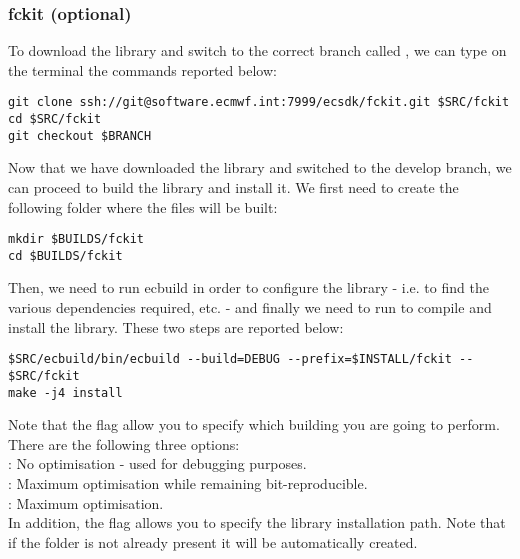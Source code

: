 \subsubsection{fckit (optional)}
To download the library and switch to the correct branch called 
, we can type on the terminal the commands reported 
below:
%
\begin{lstlisting}[style=BashStyle]
git clone ssh://git@software.ecmwf.int:7999/ecsdk/fckit.git $SRC/fckit
cd $SRC/fckit
git checkout $BRANCH
\end{lstlisting}
%
Now that we have downloaded the library and switched 
to the develop branch, we can proceed to build the 
library and install it. We first need to create the 
following folder where the files will be built:
%
\begin{lstlisting}[style=BashStyle]
mkdir $BUILDS/fckit
cd $BUILDS/fckit
\end{lstlisting}
%
Then, we need to run ecbuild in order to configure the 
library - i.e. to find the various dependencies required, 
etc. - and finally we need to run  
to compile and install the library. These two steps are 
reported below:
%
\begin{lstlisting}[style=BashStyle]
$SRC/ecbuild/bin/ecbuild --build=DEBUG --prefix=$INSTALL/fckit -- $SRC/fckit
make -j4 install
\end{lstlisting}
%
Note that the flag  allow you to specify which 
building you are going to perform. There are the following 
three options:\\
: No optimisation - used for debugging purposes.\\
: Maximum optimisation while remaining bit-reproducible.\\
: Maximum optimisation.\\
In addition, the flag  allows you to specify 
the library installation path. Note that if the folder  
is not already present it will be automatically created.



